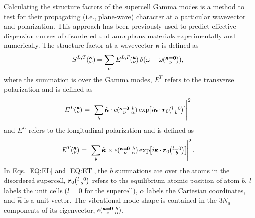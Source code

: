 Calculating the structure factors of the supercell Gamma   
modes is a method to test for their propagating (i.e., plane-wave)  
character at a particular wavevector and 
polarization. This approach has been previously used to predict 
effective dispersion curves of disordered and amorphous materials 
experimentally
\cite{benassi_evidence_1996,sette_dynamics_1998,
ruocco_relaxation_2000,ruocco_high-frequency_2001,
ruzicka_evidence_2004,
baldi_thermal_2008,baldi_sound_2010,kaya_normal_2010,
green_density_2011,baldi_emergence_2013}  
and 
numerically.
\cite{biswas_vibrational_1988,feldman_thermal_1993,
allen_diffusons_1999,feldman_numerical_1999,
taraskin_determination_1999,taraskin_propagation_2000,
volz_molecular-dynamics_2000,
gotze_evolution_2000,horbach_high_2001,
martin-mayor_dynamical_2001,feldman_calculations_2002,
ciliberti_brillouin_2003,christie_vibrational_2007,
shintani_universal_2008,wyart_scaling_2010,
beltukov_ioffe-regel_2013,larkin_predicting_2013,
marruzzo_heterogeneous_2013} 
The structure factor at a wavevector 
$\pmb{\kappa}$ is defined as\cite{allen_diffusons_1999} 
\begin{equation}\label{EQ:SLT}
S^{L,T}\kw = 
\sum_{\nu} E^{L,T}\kv
\delta (\omega-\omega\kgv),
\end{equation}
where the summation is over the Gamma modes, $E^{T}$ refers 
to the transverse polarization and is defined as
\begin{equation}\label{EQ:EL}
E^L\kv = 
\left|
\sum_{b} 
\hat{\pmb{\kappa}} \cdot e\kgvba 
\EXP{i\pmb{\kappa}\cdot\pmb{r}_0\ab{l=0}{b}} 
\right|^2
\end{equation}
and $E^{L}$ refers to the longitudinal polarization and is defined as
\begin{equation}\label{EQ:ET}
E^T\kv = 
\left|
\sum_{b} 
\hat{\pmb{\kappa}} \times e\kgvba 
\EXP{i\pmb{\kappa}\cdot\pmb{r}_0\ab{l=0}{b}} 
\right|^2.
\end{equation}
In Eqs. \eqref{EQ:EL} and \eqref{EQ:ET}, the $b$ summations are 
over the atoms in the disordered supercell, 
$\pmb{r}_0\ab{l=0}{b}$ refers to the equilibrium atomic position of 
atom $b$, $l$ labels the unit cells 
($l=0$ for the supercell), 
$\alpha$ labels the Cartesian coordinates, and 
$\hat{\pmb{\kappa}}$ is a unit vector.  
The vibrational mode shape is contained in the 
$3N_a$ components of its eigenvector, $e\mspace{-4.0mu}\left(\mspace{-8.0mu} \begin{smallmatrix} &\pmb{\kappa}=\pmb{0} &b \\ &\nu &\alpha\end{smallmatrix}\mspace{-3.0mu}\right)$.
\cite{dove_introduction_1993}

